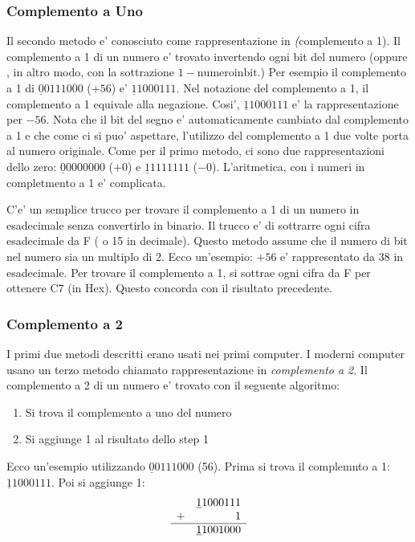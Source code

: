 \subsubsection{Complemento a Uno }
Il secondo metodo e' conosciuto come rappresentazione in \emph(complemento a 1). 
Il complemento a 1 di un numero e' trovato invertendo ogni bit del numero (oppure 
, in altro modo, con la sottrazione $1 - \mathrm{numero in bit}$.)
Per esempio il complemento a 1 di $\underline{0}0111000$ ($+56$) e' $\underline{1}1000111$.
Nel notazione del complemento a 1, il complemento a 1 equivale alla negazione. Cosi',
$\underline{1}1000111$ e' la rappresentazione per $-56$. Nota che il bit del segno 
e' automaticamente cambiato dal complemento a 1 e che come ci si puo' aspettare,
l'utilizzo del complemento a 1 due volte porta al numero originale. Come per
il primo metodo, ci sono due rappresentazioni dello zero: 
$\underline{0}0000000$ ($+0$) e $\underline{1}1111111$ ($-0$). L'aritmetica, con
i numeri in completmento a 1 e' complicata.

C'e' un semplice trucco per trovare il complemento a 1 di un numero in 
esadecimale senza convertirlo in binario. Il trucco e' di sottrarre ogni 
cifra esadecimale da F ( o 15 in decimale). Questo metodo assume che il 
numero di bit nel numero sia un multiplo di 2. Ecco un'esempio: $+56$ e' 
rappresentato da 38 in esadecimale. Per trovare il complemento a 1, si 
sottrae ogni cifra da F per ottenere C7 (in Hex). Questo concorda con
il risultato precedente.

\subsubsection{Complemento a 2
               }

I primi due metodi descritti erano usati nei primi computer. I moderni computer
usano un terzo metodo chiamato rappresentazione in \emph{complemento a 2}. Il 
complemento a 2 di un numero e' trovato con il seguente algoritmo:
\begin{enumerate}
\item Si trova il complemento a uno del numero
\item Si aggiunge 1 al risultato dello step 1
\end{enumerate}
Ecco un'esempio utilizzando $\underline{0}0111000$ (56). Prima si trova il
complemnto a 1: $\underline{1}1000111$. Poi si aggiunge 1:
\[
\begin{array}{rr}
 & \underline{1}1000111 \\
+&                    1 \\ \hline
 & \underline{1}1001000
\end{array}
\]

